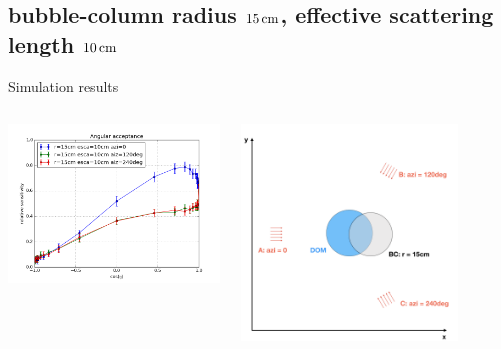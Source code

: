 \subsection{bubble-column radius $15\text{\,cm}$, effective scattering length $10\text{\,cm}$}
\begin{frame}[fragile]{Simulation results}
  \begin{columns}
    \begin{column}{0.5\textwidth}
      \includegraphics[width=\textwidth]{img/summer_scenario_r15cm_esca10cm}
    \end{column}
    \begin{column}{0.5\textwidth}
      \includegraphics[width=0.8\textwidth]{img/summerscenario-004}
    \end{column}
  \end{columns}


\end{frame}
